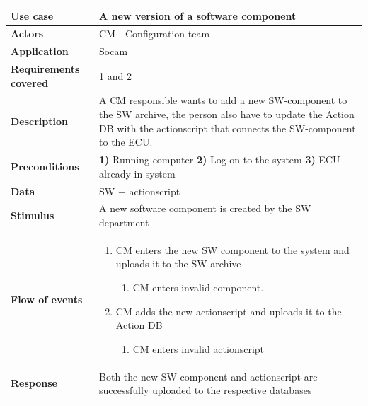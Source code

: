 	\begin{table}[H]
		\begin{tabular}{ p{4cm} | p{10cm} }
			\hline
			\rowcolor{gray}
			{\bf Use case} & {\bf A new version of a software component} \\ \hline
			{\bf Actors} & CM - Configuration team\\ \hline
			{\bf Application} & Socam \\ \hline
			{\bf Requirements covered} & 1 and 2 \\ \hline
			{\bf Description} & A CM responsible wants to add a new SW-component to the 
			SW archive, the person also have to update the Action DB with the actionscript 
			that connects the SW-component to the ECU.\\ \hline
			{\bf Preconditions} & {\bf 1)} Running computer {\bf 2)} Log on to the system {\bf 3)} ECU already in system\\ \hline
			{\bf Data} & SW + actionscript \\ \hline
			{\bf Stimulus} & A new software component is created by the SW department \\ \hline
			{\bf Flow of events} & 

				\begin{enumerate}[font=\bfseries]
					\item CM enters the new SW component to the system and uploads it to the SW archive
					\begin{enumerate}[label*=\arabic*., font=\bfseries]
						\item CM enters invalid component. 
					\end{enumerate}
					
					\item CM adds the new actionscript and uploads it to the Action DB
					\begin{enumerate}[label*=\arabic*., font=\bfseries]
						\item CM enters invalid actionscript
					\end{enumerate}
				\end{enumerate}
			
			\\ \hline
			{\bf Response} & Both the new SW component and actionscript are 
			successfully uploaded to the respective databases \\ \hline

		\end{tabular}
	\end{table}

